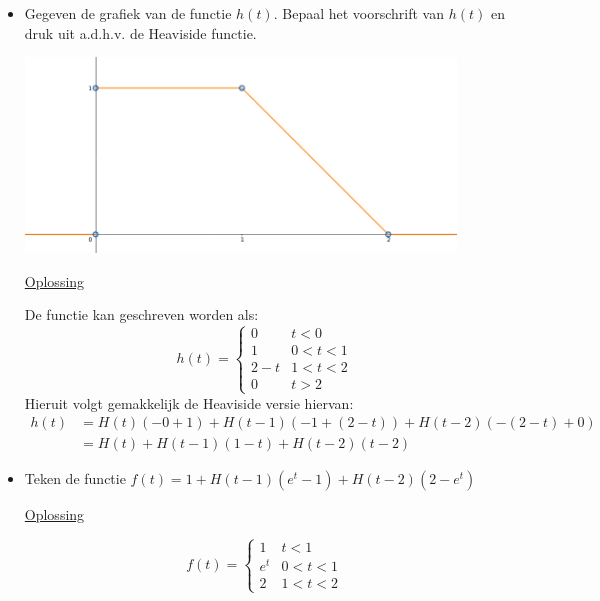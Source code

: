 \documentclass[12pt]{report}
\newcommand{\exercise}[2]{
#1


\underline{Oplossing}

#2

\hrulefill
}
\begin{document}
\begin{itemize}[label={}]
\item{ \exercise{Gegeven de grafiek van de functie $h(t)$. Bepaal het voorschrift van $h(t)$ en druk uit a.d.h.v. de Heaviside functie.
\begin{center}
\includegraphics[width=0.9\textwidth]{oef3_heaviside}
\end{center}}{
De functie kan geschreven worden als:
$$h(t) = \begin{cases}
        0 & t < 0 \\
        1 & 0 < t < 1 \\
        2 - t & 1 < t < 2 \\
        0 & t > 2
        \end{cases}
$$
Hieruit volgt gemakkelijk de Heaviside versie hiervan:
\begin{equation*}
\begin{split}
h(t) & = H(t)(-0 + 1) + H(t - 1)(-1 + (2 - t)) + H(t-2)(-(2-t) + 0) \\
    & = H(t) + H(t-1)(1 - t) + H(t- 2)(t - 2)
\end{split}
\end{equation*}}}
\item{
    \exercise{
        Teken de functie $f(t) = 1 + H(t-1)(e^{t}-1) + H(t-2)(2-e^{t})$
    }{
        $$f(t) = \begin{cases}
                    1   & t < 1     \\
                    e^t & 0 < t < 1 \\
                    2   & 1 < t < 2
                 \end{cases}
        $$
}}
\end{itemize}
\end{document}
